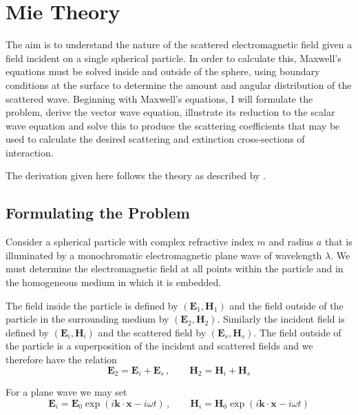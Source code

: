 \appendix %
\chapter{Mie Theory}\label{append:appendA}
The aim is to understand the nature of the scattered electromagnetic field given a field incident on a single spherical particle.  In order to calculate this, Maxwell's equations must be solved inside and outside of the sphere, using boundary conditions at the surface to determine the amount and angular distribution of the scattered wave.  Beginning with Maxwell's equations, I will formulate the problem, derive the vector wave equation, illustrate its reduction to the scalar wave equation and solve this to produce the scattering coefficients that may be used to calculate the desired scattering and extinction cross-sections of interaction.

The derivation given here follows the theory as described by \citet{Bohren1983}.

\section{Formulating the Problem}

Consider a spherical particle with complex refractive index $m$ and radius $a$ that is illuminated by a monochromatic electromagnetic plane wave of wavelength $\lambda$.  We must determine the electromagnetic field at all points within the particle and in the homogeneous medium in which it is embedded.

The field inside the particle is defined by $(\mathbf{E}_1,\mathbf{H}_1)$ and the field outside of the particle in the surrounding medium by $(\mathbf{E}_2,\mathbf{H}_2)$.  Similarly the incident field is defined by $(\mathbf{E}_i,\mathbf{H}_i)$ and the scattered field by $(\mathbf{E}_s,\mathbf{H}_s)$.  The field outside of the particle is a superposition of the incident and scattered fields and we therefore have the relation
\begin{equation}
\mathbf{E}_2=\mathbf{E}_i+\mathbf{E}_s\,, \quad \quad \mathbf{H}_2=\mathbf{H}_i+\mathbf{H}_s
\end{equation}

\noindent For a plane wave we may set
\begin{equation}
\mathbf{E}_i=\mathbf{E}_0 \exp (i \mathbf{k}\cdot\mathbf{x}-i\omega t) \, , \quad \quad \mathbf{H}_i=\mathbf{H}_0 \exp (i \mathbf{k}\cdot\mathbf{x}-i\omega t)
\end{equation}

